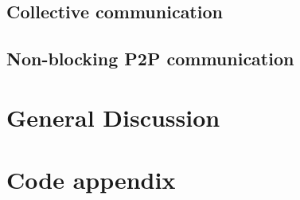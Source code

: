 \documentclass[12pt]{report}
\begin{document}
\section{Collective communication}

\section{Non-blocking P2P communication}


\chapter{General Discussion}

\appendix
\chapter*{Code appendix}





\end{document}
